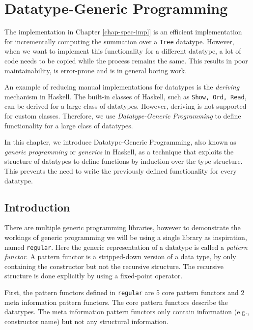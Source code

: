 \chapter{Datatype-Generic Programming}


The implementation in Chapter \ref{chap-spec-impl} is an efficient implementation for incrementally computing the summation over a \texttt{Tree} datatype. However, when we want to implement this functionality for a different datatype, a lot of code needs to be copied while the process remains the same. This results in poor maintainability, is error-prone and is in general boring work.

An example of reducing manual implementations for datatypes is the \textit{deriving} mechanism in Haskell. The built-in classes of Haskell, such as \texttt{Show, Ord, Read}, can be derived for a large class of datatypes. However, deriving is not supported for custom classes. Therefore, we use \textit{Datatype-Generic Programming}\cite*{gibbons2006datatype} to define functionality for a large class of datatypes.

In this chapter, we introduce Datatype-Generic Programming, also known as \textit{generic programming} or \textit{generics} in Haskell, as a technique that exploits the structure of datatypes to define functions by induction over the type structure. This prevents the need to write the previously defined functionality for every datatype.

\section{Introduction}
There are multiple generic programming libraries, however to demonstrate the workings of generic programming we will be using a single library as inspiration, named \texttt{regular}\cite*{regular2022}. Here the generic representation of a datatype is called a \textit{pattern functor}. A pattern functor is a stripped-down version of a data type, by only containing the constructor but not the recursive structure. The recursive structure is done explicitly by using a fixed-point operator. 

First, the pattern functors defined in \texttt{regular} are 5 core pattern functors and 2 meta information pattern functors. The core pattern functors describe the datatypes. The meta information pattern functors only contain information (e.g., constructor name) but not any structural information.

